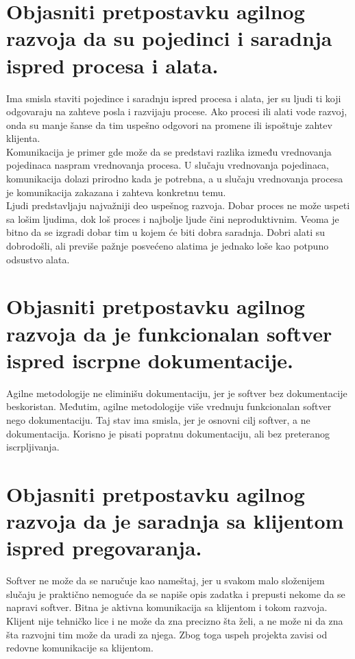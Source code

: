 \documentclass[a4paper]{article}
\begin{document}
\section{Objasniti pretpostavku agilnog razvoja da su pojedinci i saradnja ispred procesa i alata.}
  Ima smisla staviti pojedince i saradnju ispred procesa i alata, jer su ljudi ti koji odgovaraju
  na zahteve posla i razvijaju procese. Ako procesi ili alati vode razvoj, onda su manje šanse 
  da tim uspešno odgovori na promene ili ispoštuje zahtev klijenta. \\
  \indent Komunikacija
  je primer gde može da se predstavi razlika između vrednovanja pojedinaca naspram vrednovanja
  procesa. U slučaju vrednovanja pojedinaca, komunikacija dolazi prirodno kada je potrebna, a u 
  slučaju vrednovanja procesa je komunikacija zakazana i zahteva konkretnu temu. \\
  \indent Ljudi predstavljaju najvažniji deo uspešnog razvoja. Dobar proces ne može uspeti sa lošim ljudima,
  dok loš proces i najbolje ljude čini neproduktivnim. Veoma je bitno da se izgradi dobar tim u kojem
  će biti dobra saradnja. Dobri alati su dobrodošli, ali previše pažnje posvećeno alatima je 
  jednako loše kao potpuno odsustvo alata.

\section{Objasniti pretpostavku agilnog razvoja da je funkcionalan softver ispred iscrpne dokumentacije.}
  Agilne metodologije ne eliminišu dokumentaciju, jer je softver bez dokumentacije beskoristan.
  Međutim, agilne metodologije više vrednuju funkcionalan softver nego dokumentaciju. Taj stav ima 
  smisla, jer je osnovni cilj softver, a ne dokumentacija. Korisno je pisati popratnu dokumentaciju, 
  ali bez preteranog iscrpljivanja. 

\section{Objasniti pretpostavku agilnog razvoja da je saradnja sa klijentom ispred pregovaranja.}
  Softver ne može da se naručuje kao nameštaj, jer u svakom malo složenijem slučaju je praktično 
  nemoguće da se napiše opis zadatka i prepusti nekome da se napravi softver. Bitna je aktivna
  komunikacija sa klijentom i tokom razvoja. Klijent nije tehničko lice i ne može da zna precizno
  šta želi, a ne može ni da zna šta razvojni tim može da uradi za njega. Zbog toga uspeh projekta 
  zavisi od redovne komunikacije sa klijentom.
\end{document}
